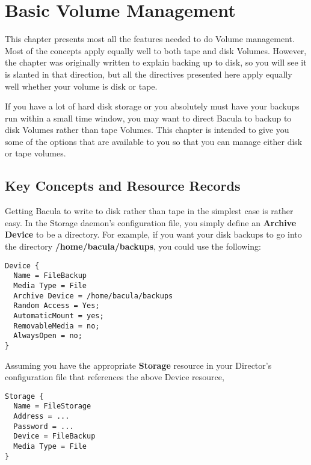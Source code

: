 
\chapter{Basic Volume Management}
\label{DiskChapter}

This chapter presents most all the features needed to do Volume management.
Most of the concepts apply equally well to both tape and disk Volumes.
However, the chapter was originally written to explain backing up to disk, so
you will see it is slanted in that direction, but all the directives
presented here apply equally well whether your volume is disk or tape. 

If you have a lot of hard disk storage or you absolutely must have your
backups run within a small time window, you may want to direct Bacula to
backup to disk Volumes rather than tape Volumes. This chapter is intended to
give you some of the options that are available to you so that you can manage
either disk or tape volumes. 

\label{Concepts}
\section{Key Concepts and Resource Records}

Getting Bacula to write to disk rather than tape in the simplest case is
rather easy. In the Storage daemon's configuration file, you simply define an
{\bf Archive Device} to be a directory. For example, if you want your disk
backups to go into the directory {\bf /home/bacula/backups}, you could use the
following: 

\footnotesize
\begin{verbatim}
Device {
  Name = FileBackup
  Media Type = File
  Archive Device = /home/bacula/backups
  Random Access = Yes;
  AutomaticMount = yes;
  RemovableMedia = no;
  AlwaysOpen = no;
}
\end{verbatim}
\normalsize

Assuming you have the appropriate {\bf Storage} resource in your Director's
configuration file that references the above Device resource, 

\footnotesize
\begin{verbatim}
Storage {
  Name = FileStorage
  Address = ...
  Password = ...
  Device = FileBackup
  Media Type = File
}
\end{verbatim}
\normalsize

